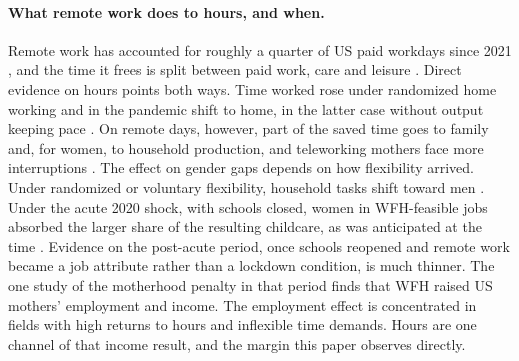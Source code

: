 \documentclass[12pt,a4paper]{article}
\begin{document}
\paragraph{What remote work does to hours, and when.}
Remote work has accounted for roughly a quarter of US paid workdays since 2021
\citep{barrero2021, barrero2023}, and the time it frees is split between paid work, care and
leisure \citep{aksoy2023}. Direct evidence on hours points both ways. Time worked rose under
randomized home working and in the pandemic shift to home, in the latter case without output keeping
pace \citep{bloom2015, gibbs2023}. On remote days, however, part of the saved time goes to family
and, for women, to household production, and teleworking mothers face more interruptions
\citep{pabilonia2022}. The effect on gender gaps depends on how flexibility arrived. Under
randomized or voluntary flexibility, household tasks shift toward men \citep{angelici2024}. Under
the acute 2020 shock, with schools closed, women in WFH-feasible jobs absorbed the larger share
of the resulting childcare, as was anticipated at the time \citep{alon2020, adamsprassl2020}.
Evidence on the post-acute period, once schools reopened and remote work became a job attribute
rather than a lockdown condition, is much thinner. The one study of the motherhood penalty in
that period \citep{harrington2025} finds that WFH raised US mothers' employment and income. The
employment effect is concentrated in fields with high returns to hours and inflexible time
demands. Hours are one channel of that income result, and the margin this paper observes
directly.
\end{document}
